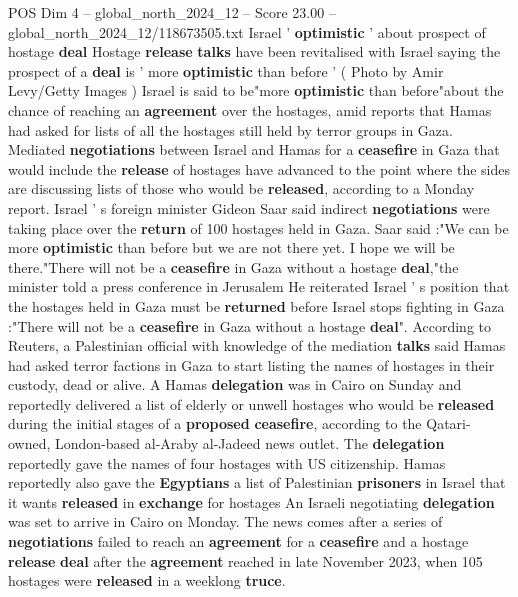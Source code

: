 \begin{textsample}{POS Dim 4 – global\_north\_2024\_12 – Score 23.00 – global\_north\_2024\_12/118673505.txt}  \label{ex:f4_pos_306}
Israel ' \textbf{optimistic} ' about prospect of hostage \textbf{deal} Hostage \textbf{release} \textbf{talks} have been revitalised with Israel saying the prospect of a \textbf{deal} is ' more \textbf{optimistic} than before ' ( Photo by Amir Levy/Getty Images ) Israel is said to be"more \textbf{optimistic} than before"about the chance of reaching an \textbf{agreement} over the hostages, amid reports that Hamas had asked for lists of all the hostages still held by terror groups in Gaza.
Mediated \textbf{negotiations} between Israel and Hamas for a \textbf{ceasefire} in Gaza that would include the \textbf{release} of hostages have advanced to the point where the sides are discussing lists of those who would be \textbf{released}, according to a Monday report.
Israel ' s foreign minister Gideon Saar said indirect \textbf{negotiations} were taking place over the \textbf{return} of 100 hostages held in Gaza.
Saar said :"We can be more \textbf{optimistic} than before but we are not there yet.
I hope we will be there."There will not be a \textbf{ceasefire} in Gaza without a hostage \textbf{deal},"the minister told a press conference in Jerusalem He reiterated Israel ' s position that the hostages held in Gaza must be \textbf{returned} before Israel stops fighting in Gaza :"There will not be a \textbf{ceasefire} in Gaza without a hostage \textbf{deal}".
According to Reuters, a Palestinian official with knowledge of the mediation \textbf{talks} said Hamas had asked terror factions in Gaza to start listing the names of hostages in their custody, dead or alive.
A Hamas \textbf{delegation} was in Cairo on Sunday and reportedly delivered a list of elderly or unwell hostages who would be \textbf{released} during the initial stages of a \textbf{proposed} \textbf{ceasefire}, according to the Qatari-owned, London-based al-Araby al-Jadeed news outlet.
The \textbf{delegation} reportedly gave the names of four hostages with US citizenship.
Hamas reportedly also gave the \textbf{Egyptians} a list of Palestinian \textbf{prisoners} in Israel that it wants \textbf{released} in \textbf{exchange} for hostages An Israeli negotiating \textbf{delegation} was set to arrive in Cairo on Monday.
The news comes after a series of \textbf{negotiations} failed to reach an \textbf{agreement} for a \textbf{ceasefire} and a hostage \textbf{release} \textbf{deal} after the \textbf{agreement} reached in late November 2023, when 105 hostages were \textbf{released} in a weeklong \textbf{truce}.

\end{textsample}
